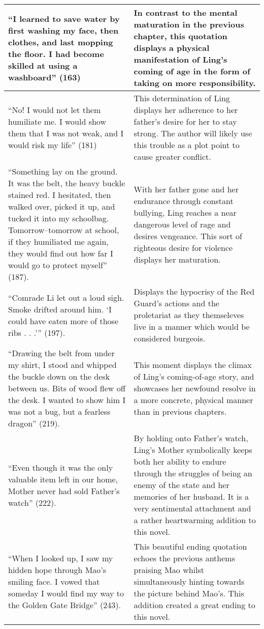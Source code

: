 \documentclass[12pt]{article}
\begin{document}
\begin{longtable}{| p{} | p{} |}
  \hline
  ``I learned to save water by first washing my face, then clothes, and last mopping the floor. I had become skilled at using a washboard'' (163) & In contrast to the mental maturation in the previous chapter, this quotation displays a physical manifestation of Ling's coming of age in the form of taking on more responsibility. \\
  \hline
  ``No! I would not let them humiliate me. I would show them that I was not weak, and I would risk my life'' (181) & This determination of Ling displays her adherence to her father's desire for her to stay strong. The author will likely use this trouble as a plot point to cause greater conflict. \\
  \hline
  ``Something lay on the ground. It was the belt, the heavy buckle stained red. I hesitated, then walked over, picked it up, and tucked it into my schoolbag. Tomorrow--tomorrow at school, if they humiliated me again, they would find out how far I would go to protect myself'' (187). & With her father gone and her endurance through constant bullying, Ling reaches a near dangerous level of rage and desires vengeance. This sort of righteous desire for violence displays her maturation. \\
  \hline
  ``Comrade Li let out a loud sigh. Smoke drifted around him. `I could have eaten more of those ribs . . .''' (197). & Displays the hypocrisy of the Red Guard's actions and the proletariat as they themseleves live in a manner which would be considered burgeois. \\
  \hline
  ``Drawing the belt from under my shirt, I stood and whipped the buckle down on the desk between us. Bits of wood flew off the desk. I wanted to show him I was not a bug, but a fearless dragon'' (219). & This moment displays the climax of Ling's coming-of-age story, and showcases her newfound resolve in a more concrete, physical manner than in previous chapters. \\
  \hline
  ``Even though it was the only valuable item left in our home, Mother never had sold Father's watch'' (222). & By holding onto Father's watch, Ling's Mother symbolically keeps both her ability to endure through the struggles of being an enemy of the state and her memories of her husband. It is a very sentimental attachment and a rather heartwarming addition to this novel. \\
  \hline
  ``When I looked up, I saw my hidden hope through Mao's smiling face. I vowed that someday I would find my way to the Golden Gate Bridge'' (243). & This beautiful ending quotation echoes the previous anthems praising Mao whilst simultaneously hinting towards the picture behind Mao's. This addition created a great ending to this novel. \\
  \hline
\end{longtable}
\end{document}
